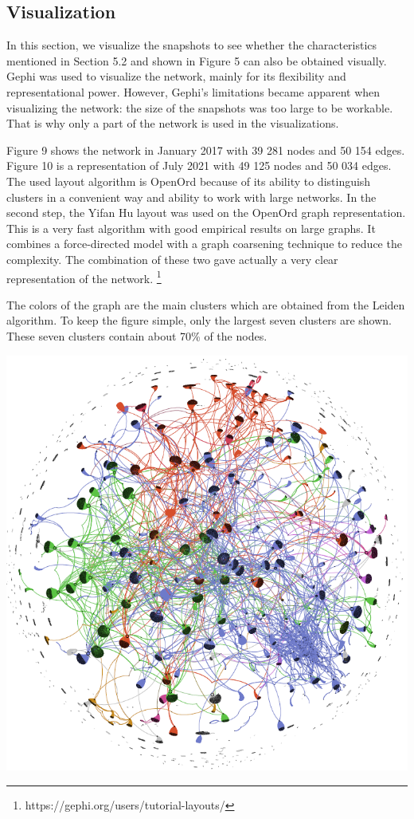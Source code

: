 \documentclass[10pt,a4paper]{article}
\newenvironment{Figure}
  {\par\medskip\noindent\minipage{\linewidth}}
  {\endminipage\par\medskip}
\begin{document}
\begin{multicols}{2}
\section{Visualization} 
In this section, we visualize the snapshots to see whether the characteristics mentioned in Section 5.2 and shown in Figure 5 can also be obtained visually. 
Gephi was used to visualize the network, mainly for its flexibility and representational power. 
However, Gephi's limitations became apparent when visualizing the network: the size of the snapshots was too large to be workable. That is why only a part of the network is used in the visualizations. 

Figure 9 shows the network in January 2017 with 39 281 nodes and 50 154 edges. Figure 10 is a representation of July 2021 with 49 125 nodes and 50 034 edges. The used layout algorithm is OpenOrd \cite{martin2011openord} because of its ability to distinguish clusters in a convenient way and ability to work with large networks. In the second step, the Yifan Hu layout was used on the OpenOrd graph representation. This is a very fast algorithm with good empirical results on large graphs. It combines a force-directed model with a graph coarsening technique to reduce the complexity. The combination of these two gave actually a very clear representation of the network. \footnote{https://gephi.org/users/tutorial-layouts/}

The colors of the graph are the main clusters which are obtained from the Leiden algorithm. To keep the figure simple, only the largest seven clusters are shown. These seven clusters contain about 70\% of the nodes. 

\begin{Figure}
\centering
\includegraphics[scale=0.385]{figures/Jan_17_edges.png}
\label{clusters}
\end{Figure}


\end{multicols}
\end{document}
